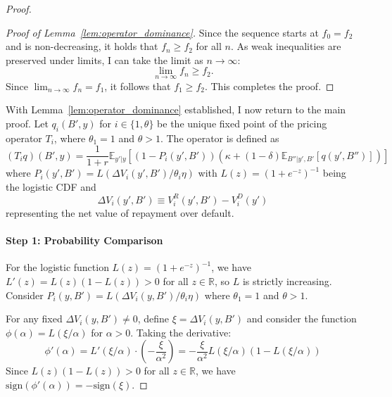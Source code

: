 \documentclass[12pt]{article}
\theoremstyle{plain}
\begin{document}
\begin{proof}
\begin{proof}[Proof of Lemma~\ref{lem:operator_dominance}]
		Since the sequence starts at $f_0=f_2$ and is non-decreasing, it holds that
		$f_n \ge f_2$ for all $n$. As weak inequalities are preserved under limits, I
		can take the limit as $n \to \infty$:
		\begin{equation*}
			\lim_{n \to \infty} f_n \ge f_2.
		\end{equation*}
		Since $\lim_{n \to \infty} f_n = f_1$, it follows that $f_1 \ge f_2$. This completes the proof.
	\end{proof}
	With Lemma~\ref{lem:operator_dominance} established, I now return to the main proof. Let $q_i(B', y)$ for $i \in \{1, \theta\}$ be the unique fixed point of the pricing operator $T_i$, where $\theta_1=1$ and $\theta>1$. The operator is defined as
	\begin{equation}
		(T_i q)(B', y) = \frac{1}{1+r} \mathbb{E}_{y'|y} \left[ (1 - P_i(y', B')) \left( \kappa + (1-\delta) \mathbb{E}_{B''|y',B'} \left[ q(y', B'') \right] \right) \right] \label{eq:pricing_operator}
	\end{equation}
	where $P_i(y', B') = L(\Delta V_i(y', B')/\theta_i\eta)$ with $L(z) = (1+e^{-z})^{-1}$ being the logistic CDF and
	\begin{equation}
		\Delta V_i(y', B') \equiv V_i^R(y', B') - V_i^D(y') \label{eq:net_value_definition}
	\end{equation}
	representing the net value of repayment over default. 	\paragraph{Step 1: Probability Comparison} For the logistic function $L(z) = (1+e^{-z})^{-1}$, we have $L'(z) =
		L(z)(1-L(z)) > 0$ for all $z \in \mathbb{R}$, so $L$ is strictly increasing.
	Consider $P_i(y,B') = L(\Delta V_i(y,B')/\theta_i\eta)$ where $\theta_1 = 1$
	and $\theta > 1$.

	For any fixed $\Delta V_i(y,B') \neq 0$, define $\xi = \Delta V_i(y,B')$ and
	consider the function $\phi(\alpha) = L(\xi/\alpha)$ for $\alpha > 0$. Taking
	the derivative:
	\begin{equation}
		\phi'(\alpha) = L'(\xi/\alpha) \cdot \left(-\frac{\xi}{\alpha^2}\right) = -\frac{\xi}{\alpha^2} L(\xi/\alpha)(1-L(\xi/\alpha)) \label{eq:phi_derivative}
	\end{equation}
	Since $L(z)(1-L(z)) > 0$ for all $z \in \mathbb{R}$, we have $\mathrm{sign}(\phi'(\alpha)) = -\mathrm{sign}(\xi)$.


\end{proof}
\end{document}
